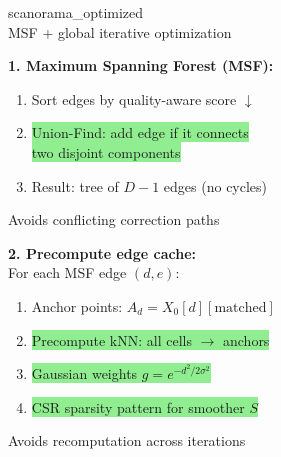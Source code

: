 \documentclass[8pt]{article}
\newlength{\colw}
\begin{document}
\begin{minipage}[t]{\colw}
\begin{tcolorbox}[colback=hdrB, colframe=hdrB, fontupper=\bfseries\footnotesize\color{white},
    arc=2pt, left=2pt, right=2pt, top=1pt, bottom=1pt]
\centering scanorama\_optimized\\[-2pt]
{\scriptsize\mdseries MSF + global iterative optimization}
\end{tcolorbox}
\vspace{1pt}

\begin{keyboxG}
\textbf{1. Maximum Spanning Forest (MSF):}
\begin{enumerate}[leftmargin=1em, itemsep=0pt, topsep=1pt, parsep=0pt]
\item Sort edges by quality-aware score $\downarrow$
\item \colorbox{lightgreen}{Union-Find: add edge if it connects\\
    two disjoint components}
\item Result: tree of $D{-}1$ edges (no cycles)
\end{enumerate}
{\scriptsize\color{added} Avoids conflicting correction paths}
\end{keyboxG}\vspace{1pt}

\begin{keyboxG}
\textbf{2. Precompute edge cache:}\\
For each MSF edge $(d, e)$:
\begin{enumerate}[leftmargin=1em, itemsep=0pt, topsep=1pt, parsep=0pt]
\item Anchor points: $A_d = X_0[d][\text{matched}]$
\item \colorbox{lightgreen}{Precompute kNN: all cells $\to$ anchors}
\item \colorbox{lightgreen}{Gaussian weights $g = e^{-d^2/2\sigma^2}$}
\item \colorbox{lightgreen}{CSR sparsity pattern for smoother $S$}
\end{enumerate}
{\scriptsize\color{added} Avoids recomputation across iterations}
\end{keyboxG}\vspace{1pt}


\end{minipage}
\end{document}
